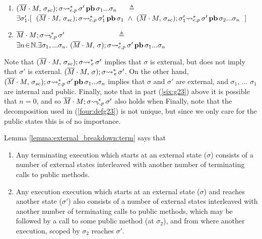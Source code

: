 \begin{definition}
\begin{enumerate}
 
\item
\label{four:defg23}
$(\overline{M}\cdot M,\, {\sigma_{sc}}); \sigma {{\rightsquigarrow^*}} \!\!\!_{e,p}\, \sigma'\, {\textbf{pb}}\, {\sigma_1...\sigma_n}$   \ \  $\triangleq$ \ \ 
$\exists \sigma_1'.[ \  \
 \WithExtPub {\Mtwo\cdot M} {\sigma\bd}  {\sigma}  {\sigma_1'} {\sigma_1} 
  \ \wedge \ 
    {\WithExtPub {\Mtwo\cdot M} {\sigma\bd}  {\sigma_1'}  {\sigma'} {\sigma_2...\sigma_n} }   \  \ ]
$

\item
\label{six:g23}
$\overline{M}\cdot M; \sigma {\rightsquigarrow^*}\!\!\!\!_{e,p}\, \sigma' $    \ \ \   \ \ \  \ \ \ \   \ \ \ \  $\triangleq$   \ \ 
 $ \exists n\!\in\! \mathbb{N}. \exists \sigma_1,...\sigma_n. \ (\overline{M}\cdot M,\, {\sigma}); \sigma {{\rightsquigarrow^*}} \!\!\!_{e,p}\, \sigma'\, {\textbf{pb}}\, {\sigma_1...\sigma_n} 
$
\end{enumerate}
\end{definition}

\vspace{.1cm}

Note   that 
${(\overline{M}\cdot M,\, {\sigma_{sc}}); \sigma{\rightsquigarrow^*}\!\!_{e}\, \sigma'}$ implies that $\sigma$ is external, but does not
imply that $\sigma'$ is external.
${(\overline{M}\cdot M,\, {\sigma}); \sigma{\rightsquigarrow^*}\!\!_{e}\, \sigma'}$. 
On the other hand, $(\overline{M}\cdot M,\, {\sigma_{sc}}); \sigma {{\rightsquigarrow^*}} \!\!\!_{e,p}\, \sigma'\, {\textbf{pb}}\, {\sigma_1...\sigma_n}$ implies that $\sigma$ and $\sigma'$ are external, and  $\sigma_1$, ... $\sigma_1$  are internal and public.
Finally, note that   in part (\ref{six:g23}) above it is possible that $n=0$, and so 
$\overline{M}\cdot M; \sigma {\rightsquigarrow^*}\!\!\!\!_{e,p}\, \sigma' $  also holds when
Finally, note that the decomposition used in (\ref{four:defg23}) is not unique, but since we only care for the public states this is of no importance.

\vspace{.2cm}

Lemma \ref{lemma:external_breakdown:term} says that\\
\begin{enumerate}
\item
Any terminating execution which starts at an external state ($\sigma$) consists of a number of external states interleaved with another number of terminating calls to public methods.
\item
Any execution execution which starts at an external state ($\sigma$) and reaches another state ($\sigma'$) also consists of a number of external states interleaved with another number of terminating calls to public methods, which may be followed by a call to some public method (at $\sigma_2$), and from where another execution, scoped by $\sigma_2$  reaches $\sigma'$.
\end{enumerate}


